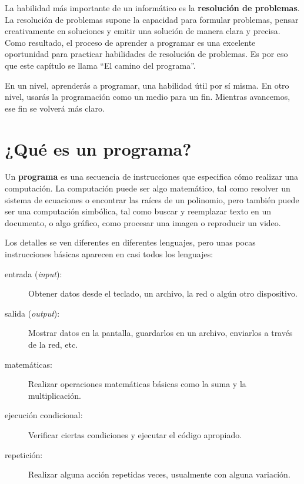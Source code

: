 \documentclass[10pt]{book}
\begin{document}
La habilidad más importante de un informático es la {\bf resolución
 de problemas}.  La resolución de problemas supone la capacidad para
 formular problemas, pensar creativamente en soluciones y emitir una solución
de manera clara y precisa.  Como resultado, el proceso de aprender a
programar es una excelente oportunidad para practicar habilidades de
resolución de problemas.  Es por eso que este capítulo se llama ``El camino del
programa''.

En un nivel, aprenderás a programar, una habilidad útil por
sí misma.  En otro nivel, usarás la programación como un medio para un
fin.  Mientras avancemos, ese fin se volverá más claro.


\section{¿Qué es un programa?}

Un {\bf programa} es una secuencia de instrucciones que especifica cómo
realizar una computación.  La computación puede ser algo matemático,
tal como resolver un sistema de ecuaciones o encontrar las raíces de un
polinomio, pero también puede ser una computación simbólica, tal como
buscar y reemplazar texto en un documento, o algo gráfico, como procesar
una imagen o reproducir un video.

Los detalles se ven diferentes en diferentes lenguajes, pero unas pocas
instrucciones básicas aparecen en casi todos los lenguajes:

\begin{description}

\item[entrada ({\em input}):] Obtener datos desde el teclado, un archivo, la red o algún
otro dispositivo.

\item[salida ({\em output}):] Mostrar datos en la pantalla, guardarlos en un
archivo, enviarlos a través de la red, etc.

\item[matemáticas:] Realizar operaciones matemáticas básicas como la suma y
la multiplicación.

\item[ejecución condicional:] Verificar ciertas condiciones y
ejecutar el código apropiado.

\item[repetición:] Realizar alguna acción repetidas veces, usualmente con
alguna variación.

\end{description}
\end{document}
